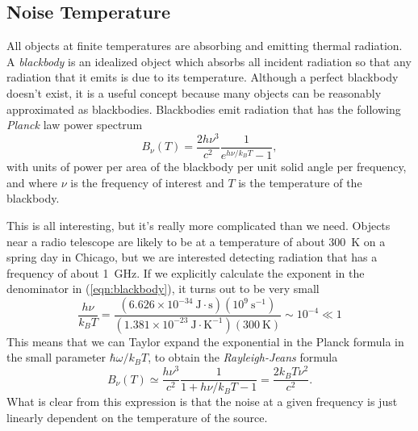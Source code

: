 \documentclass[11pt]{amsart}
\begin{document}
\subsection{Noise Temperature}
All objects at finite temperatures are absorbing and emitting thermal radiation. A \emph{blackbody} is an idealized object which absorbs all incident radiation so that any radiation that it emits is due to its temperature. Although a perfect blackbody doesn't exist, it is a useful concept because many objects can be reasonably approximated as blackbodies. Blackbodies emit radiation that has the following \emph{Planck} law power spectrum
\begin{equation}\label{eqn:blackbody}
B_\nu(T) = \frac{2h\nu^3}{c^2} \frac{1}{e^{h \nu/k_B T} - 1},
\end{equation}
with units of power per area of the blackbody per unit solid angle per frequency, and where $\nu$ is the frequency of interest and $T$ is the temperature of the blackbody.

This is all interesting, but it's really more complicated than we need. Objects near a radio telescope are likely to be at a temperature of about 300~K on a spring day in Chicago, but we are interested detecting radiation that has a frequency of about 1~GHz. If we explicitly calculate the exponent in the denominator in (\ref{eqn:blackbody}), it turns out to be very small
\begin{equation}
\frac{h\nu}{k_B T} = \frac{(6.626 \times 10^{-34}~\textrm{J}\cdot\textrm{s})(10^9~\textrm{s}^{-1})}{(1.381 \times 10^{-23}~\textrm{J} \cdot \textrm{K}^{-1})(300~\textrm{K})} \sim 10^{-4} \ll 1
\end{equation}
This means that we can Taylor expand the exponential in the Planck formula in the small parameter $\hbar \omega/k_B T$, to obtain the \emph{Rayleigh-Jeans} formula
\begin{equation}\label{eqn:RayleighJeans}
B_\nu(T) \simeq \frac{h\nu^3}{c^2} \frac{1}{1 + h \nu/k_B T - 1} = \frac{2k_B T\nu^2}{c^2}.
\end{equation}
What is clear from this expression is that the noise at a given frequency is just linearly dependent on the temperature of the source.
\end{document}
